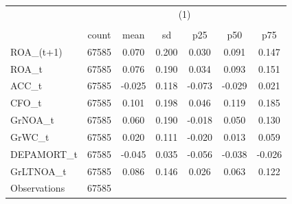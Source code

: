 {
\def\sym#1{\ifmmode^{#1}\else\(^{#1}\)\fi}
\begin{tabular}{l*{1}{cccccc}}
\hline\hline
                    &\multicolumn{6}{c}{(1)}                                                      \\
                    &\multicolumn{6}{c}{}                                                         \\
                    &       count&        mean&          sd&         p25&         p50&         p75\\
\hline
ROA\_(t+1)           &       67585&       0.070&       0.200&       0.030&       0.091&       0.147\\
ROA\_t               &       67585&       0.076&       0.190&       0.034&       0.093&       0.151\\
ACC\_t               &       67585&      -0.025&       0.118&      -0.073&      -0.029&       0.021\\
CFO\_t               &       67585&       0.101&       0.198&       0.046&       0.119&       0.185\\
GrNOA\_t             &       67585&       0.060&       0.190&      -0.018&       0.050&       0.130\\
GrWC\_t              &       67585&       0.020&       0.111&      -0.020&       0.013&       0.059\\
DEPAMORT\_t          &       67585&      -0.045&       0.035&      -0.056&      -0.038&      -0.026\\
GrLTNOA\_t           &       67585&       0.086&       0.146&       0.026&       0.063&       0.122\\
\hline
Observations        &       67585&            &            &            &            &            \\
\hline\hline
\end{tabular}
}
